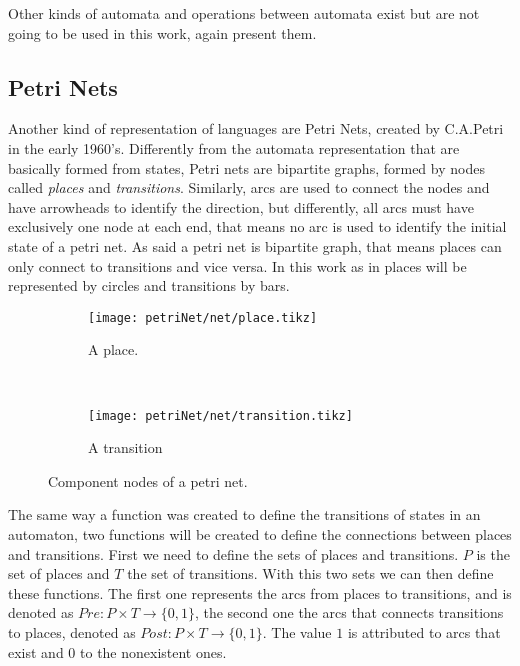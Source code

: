 Other kinds of automata and operations between automata exist but are not going
to be used in this work, again \cite{cassandras2009introduction} present them.

\subsection{Petri Nets}
\label{sec:petriNets}
Another kind of representation of languages are Petri Nets, created by C.A.Petri
in the early 1960's. Differently from the automata representation that are
basically formed from states, Petri nets are bipartite graphs, formed by nodes
called \emph{places} and \emph{transitions}. Similarly, arcs are used to connect
the nodes and have arrowheads to identify the direction,
but differently, all arcs must have exclusively one node at each end, that means
no arc is used to identify the initial state of a petri net. As said a petri net is
bipartite graph, that means places can only connect to transitions and vice
versa. In this work as in \cite{david2005discrete} places will be represented by
circles and transitions by bars. 
\begin{figure}[H]
  \centering
  \begin{subfigure}[t]{0.45\textwidth}
  \centering
  \texttt{[image: petriNet/net/place.tikz]}
  \caption{A place.}
\end{subfigure}
~
\begin{subfigure}[t]{0.5\textwidth}
  \centering
  \texttt{[image: petriNet/net/transition.tikz]}
  \caption{A transition}
\end{subfigure}
  \caption{Component nodes of a petri net.}  
\end{figure}

The same way a function was created to define the transitions of states in an
automaton, two functions will be created to define the connections between places
and transitions. First we need to define the sets of places and transitions. $P$
is the set of places and $T$ the set of transitions. With this two sets we can
then define these functions. The first one represents the arcs
from places to transitions, and is denoted as $Pre: P \times T \rightarrow
\{0, 1\}$, the second one the arcs that connects transitions to places, denoted
as $Post: P \times T \rightarrow \{0,1\}$. The value $1$ is attributed to arcs
that exist and $0$ to the nonexistent ones.


